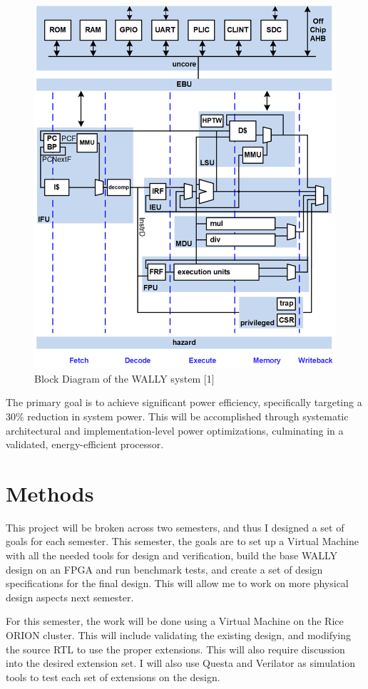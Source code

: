 \documentclass[conference]{IEEEtran}
\begin{document}
\begin{figure}[htbp]
\centerline{\includegraphics[width=0.9\linewidth]{WALLY_diagram.png}}
\caption{Block Diagram of the WALLY system [1]}
\label{fig}
\end{figure}

The primary goal is to achieve significant power efficiency, specifically targeting a 30\% reduction in system power. This will be accomplished through systematic architectural and implementation-level power optimizations, culminating in a validated, energy-efficient processor.

\section{Methods}

This project will be broken across two semesters, and thus I designed a set of goals for each semester. This semester, the goals are to set up a Virtual Machine with all the needed tools for design and verification, build the base WALLY design on an FPGA and run benchmark tests, and create a set of design specifications for the final design. This will allow me to work on more physical design aspects next semester.

For this semester, the work will be done using a Virtual Machine on the Rice ORION cluster. This will include validating the existing design, and modifying the source RTL to use the proper extensions. This will also require discussion into the desired extension set. I will also use Questa and Verilator as simulation tools to test each set of extensions on the design.
\end{document}
